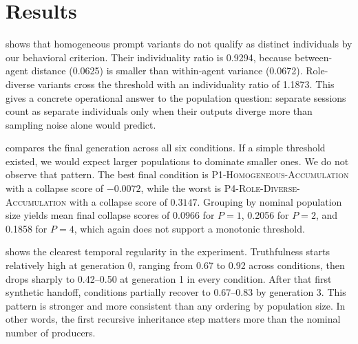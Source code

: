 \section{Results}
\label{sec:results}

 shows that homogeneous prompt variants do not qualify as distinct individuals by our behavioral criterion. Their individuality ratio is 0.9294, because between-agent distance (0.0625) is smaller than within-agent variance (0.0672). Role-diverse variants cross the threshold with an individuality ratio of 1.1873. This gives a concrete operational answer to the population question: separate sessions count as separate individuals only when their outputs diverge more than sampling noise alone would predict.



 compares the final generation across all six conditions. If a simple threshold existed, we would expect larger populations to dominate smaller ones. We do not observe that pattern. The best final condition is \textsc{P1-Homogeneous-Accumulation} with a collapse score of $-0.0072$, while the worst is \textsc{P4-Role-Diverse-Accumulation} with a collapse score of $0.3147$. Grouping by nominal population size yields mean final collapse scores of 0.0966 for $P{=}1$, 0.2056 for $P{=}2$, and 0.1858 for $P{=}4$, which again does not support a monotonic threshold.



 shows the clearest temporal regularity in the experiment. Truthfulness starts relatively high at generation 0, ranging from 0.67 to 0.92 across conditions, then drops sharply to 0.42--0.50 at generation 1 in every condition. After that first synthetic handoff, conditions partially recover to 0.67--0.83 by generation 3. This pattern is stronger and more consistent than any ordering by population size. In other words, the first recursive inheritance step matters more than the nominal number of producers.

